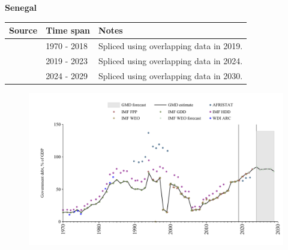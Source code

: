 \documentclass[12pt,a4paper,landscape]{article}
\begin{document}
\begin{adjustbox}{max totalsize={\paperwidth}{\paperheight},center}
\begin{minipage}[t][\textheight][t]{\textwidth}
\vspace*{0.5cm}
{}
\begin{center}
{\Large\bfseries Senegal}
\end{center}
\vspace{0.5cm}
\begin{table}[H]
\centering
\small
\begin{tabular}{|l|l|l|}
\hline
\textbf{Source} & \textbf{Time span} & \textbf{Notes} \\
\hline
\rowcolor{white}\cite{IMF_GDD}& 1970 - 2018 &Spliced using overlapping data in 2019.\\
\rowcolor{lightgray}\cite{IMF_FPP}& 2019 - 2023 &Spliced using overlapping data in 2024.\\
\rowcolor{white}\cite{IMF_WEO_forecast}& 2024 - 2029 &Spliced using overlapping data in 2030.\\
\hline
\end{tabular}
\end{table}
\begin{figure}[H]
\centering
\includegraphics[width=\textwidth,height=0.6\textheight,keepaspectratio]{graphs/SEN_govdebt_GDP.pdf}
\end{figure}
\end{minipage}
\end{adjustbox}
\end{document}
